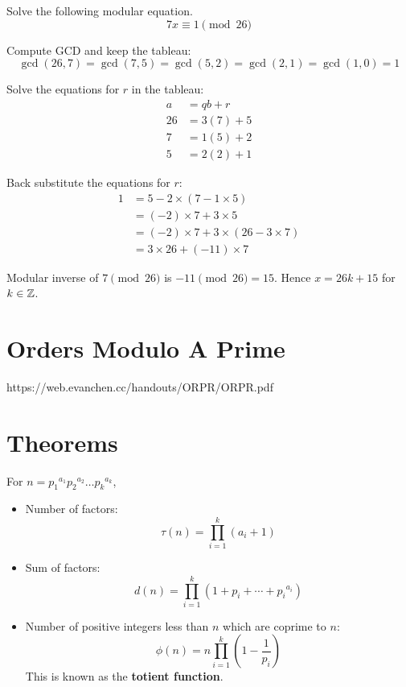 \begin{exmp}{}{}
Solve the following modular equation.
\[ 7x \equiv 1 \pmod {26} \]
\end{exmp}
\begin{solution}
Compute GCD and keep the tableau:
\[ \gcd(26,7) = \gcd(7,5) = \gcd(5,2) = \gcd(2,1) = \gcd(1,0) = 1 \]

Solve the equations for $r$ in the tableau:
\begin{align*}
a &= qb + r \\
26 &= 3(7) + 5 \\
7 &= 1(5) + 2 \\
5 &= 2(2) + 1
\end{align*}

Back substitute the equations for $r$:
\begin{align*}
1 &= 5 - 2 \times (7 - 1 \times 5) \\
&= (-2) \times 7 + 3 \times 5 \\
&= (-2) \times 7 + 3 \times (26 - 3 \times 7) \\
&= 3 \times 26 + (-11) \times 7
\end{align*}

Modular inverse of $7 \pmod {26}$ is $-11 \pmod {26} = 15$. Hence $x = 26k + 15$ for $k\in\mathbb Z$.
\end{solution}
\pagebreak

\section{Orders Modulo A Prime}
https://web.evanchen.cc/handouts/ORPR/ORPR.pdf

\section{Theorems}
For $n={p_1}^{a_1} {p_2}^{a_2} \dots {p_k}^{a_k}$,
\begin{itemize}
\item Number of factors: 
\[ \tau(n) = \prod_{i=1}^k (a_i+1) \]
\item Sum of factors:
\[ d(n) = \prod_{i=1}^k (1+p_i+\cdots+{p_i}^{a_i}) \]
\item Number of positive integers less than $n$ which are coprime to $n$:
\[ \phi(n) = n \prod_{i=1}^k \left(1-\frac{1}{p_i}\right) \]
This is known as the \textbf{totient function}.
\end{itemize}

